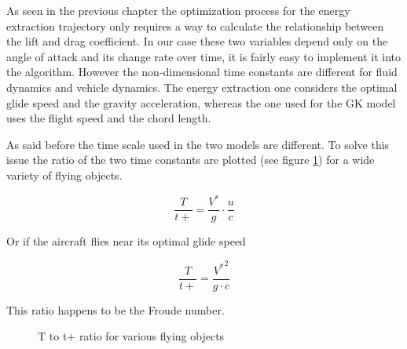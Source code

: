 \par As seen in the previous chapter the optimization process for the energy extraction trajectory only requires a way to calculate the relationship between the lift and drag coefficient.
In our case these two variables depend only on the angle of attack and its change rate over time, it is fairly easy to implement it into the algorithm.
However the non-dimensional time constants are different for fluid dynamics and vehicle dynamics.
The energy extraction one considers the optimal glide speed and the gravity acceleration, whereas the one used for the GK model uses the flight speed and the chord length.

As said before the time scale used in the two models are different.
To solve this issue the ratio of the two time constants are plotted (see figure \ref{fig:T_t+_ratio}) for a wide variety of flying objects.

\begin{equation}
  \frac{T}{t+}=\frac{V^*}{g} \cdot \frac{u}{c}
  \label{eqn:T_t+}
\end{equation}

Or if the aircraft flies near its optimal glide speed

\begin{equation}
  \frac{T}{t+}=\frac{{V^*}^2}{g \cdot c}
  \label{eqn:T_t+_ratio}
\end{equation}

This ratio happens to be the Froude number.

\begin{figure}[ht]
  \begin{center}
  \end{center}
  \caption{T to t+ ratio for various flying objects}
  \label{fig:T_t+_ratio}
\end{figure}

